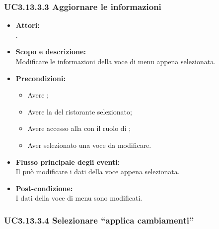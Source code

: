 \subsubsection{UC3.13.3.3 Aggiornare le informazioni} \label{UC3.13.3.3}

\begin{itemize}
	\item \textbf{Attori:}
	\\.
	\item \textbf{Scopo e descrizione:} 
	\\Modificare le informazioni della voce di menu appena selezionata.
	\item \textbf{Precondizioni:}
	\begin{itemize}
		\item Avere ;
		\item Avere la  del ristorante selezionato;
		\item Avere accesso alla  con il ruolo di ;
		\item Aver selezionato una voce da modificare.
	\end{itemize}
	\item \textbf{Flusso principale degli eventi:}
	\\Il {} può modificare i dati della voce appena selezionata.
	\item \textbf{Post-condizione:}
	\\I dati della voce di menu sono modificati.
\end{itemize}

\subsubsection{UC3.13.3.4 Selezionare “applica cambiamenti”} \label{UC3.13.3.4}

